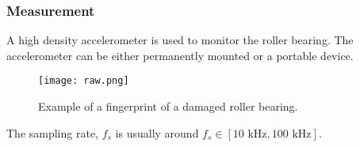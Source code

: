 \begin{frame}
    \frametitle{Measurement}
    \small
    A high density accelerometer is used to monitor the roller bearing.  The accelerometer can be either permanently mounted or a portable device.
    \begin{figure}
        \centering
        \texttt{[image: raw.png]}
        \caption{Example of a fingerprint of a damaged roller bearing.}
        \label{fig:raw}
    \end{figure}
    The sampling rate, $f_s$ is usually around $f_s \in [10\text{ kHz}, 100\text{ kHz}]$.
   
\end{frame}